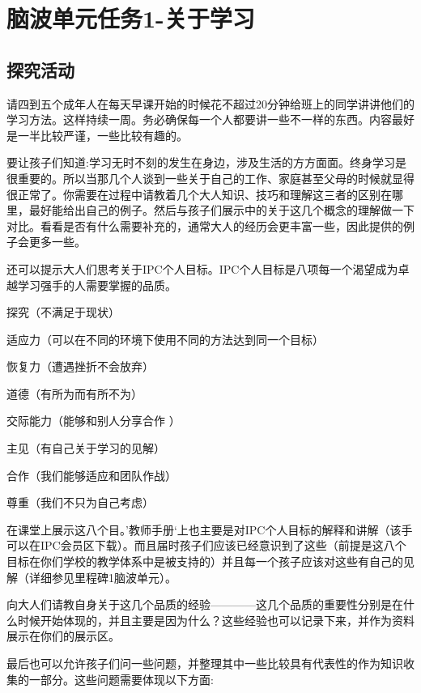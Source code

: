 \chapter{脑波单元任务1-关于学习}
  
\section{探究活动}
    请四到五个成年人在每天早课开始的时候花不超过20分钟给班上的同学讲讲他们的学习方法。这样持续一周。务必确保每一个人都要讲一些不一样的东西。内容最好是一半比较严谨，一些比较有趣的。\par
    要让孩子们知道:学习无时不刻的发生在身边，涉及生活的方方面面。终身学习是很重要的。所以当那几个人谈到一些关于自己的工作、家庭甚至父母的时候就显得很正常了。你需要在过程中请教着几个大人知识、技巧和理解这三者的区别在哪里，最好能给出自己的例子。然后与孩子们展示中的关于这几个概念的理解做一下对比。看看是否有什么需要补充的，通常大人的经历会更丰富一些，因此提供的例子会更多一些。\par
    还可以提示大人们思考关于IPC个人目标。IPC个人目标是八项每一个渴望成为卓越学习强手的人需要掌握的品质。\par
    \begin{\itemize}
      \item 探究（不满足于现状）
      \item 适应力（可以在不同的环境下使用不同的方法达到同一个目标）
      \item 恢复力（遭遇挫折不会放弃）
      \item 道德（有所为而有所不为）
      \item 交际能力（能够和别人分享合作 ）  
      \item 主见（有自己关于学习的见解）  
      \item 合作（我们能够适应和团队作战） 
      \item 尊重（我们不只为自己考虑）  
    \end{\itemize}
    在课堂上展示这八个目。’教师手册‘上也主要是对IPC个人目标的解释和讲解（该手可以在IPC会员区下载）。而且届时孩子们应该已经意识到了这些（前提是这八个目标在你们学校的教学体系中是被支持的）并且每一个孩子应该对这些有自己的见解（详细参见里程碑1脑波单元）。\par
    向大人们请教自身关于这几个品质的经验————这几个品质的重要性分别是在什么时候开始体现的，并且主要是因为什么？这些经验也可以记录下来，并作为资料展示在你们的展示区。\par
    最后也可以允许孩子们问一些问题，并整理其中一些比较具有代表性的作为知识收集的一部分。这些问题需要体现以下方面:\par

